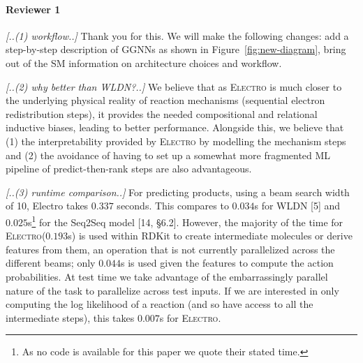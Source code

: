 \documentclass{article}
\newcommand{\ourModel}{\textsc{Electro}\xspace}
\begin{document}
\paragraph{Reviewer 1}

\emph{[..(1) workflow..]}
Thank you for this. We will make the following changes: add a step-by-step description of GGNNs as shown in Figure~\ref{fig:new-diagram}, bring out of the SM information on architecture choices and workflow. 

\emph{[..(2) why better than WLDN?..]}
We believe that as \ourModel is much closer to the underlying physical reality of reaction mechanisms (sequential electron redistribution steps), it provides the needed compositional and relational inductive biases, leading to better performance.
 Alongside this, we believe that (1) the interpretability provided by \ourModel by modelling the mechanism steps and (2) the avoidance of having to set up a somewhat more fragmented ML pipeline of predict-then-rank steps are also advantageous.%

\emph{[..(3) runtime comparison..]}
For predicting products, using a beam search width of 10, Electro takes $0.337$ seconds. This compares to $0.034$s for WLDN [5] and $0.025$s\footnote{As no code is available for this paper we quote their stated time.} for the Seq2Seq model [14, \S6.2]. 
 However, the majority of the time for \ourModel ($0.193$s) is used within RDKit to create intermediate molecules or derive features from them, an operation that is not currently parallelized across the different beams; only $0.044$s is used given the features to compute the action probabilities.
  At test time we take advantage of the embarrassingly parallel nature of the task to parallelize across test inputs. 
   If we are interested in only computing the log likelihood of a reaction (and so have access to all the intermediate steps), this takes $0.007$s for \ourModel. 
\end{document}
